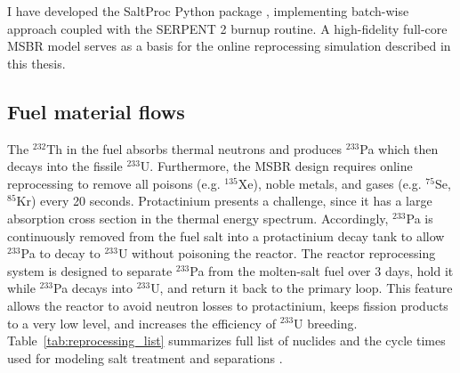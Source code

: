I have developed the SaltProc Python package \cite{andrei_rykhlevskii_arfc/saltproc:_2018}, implementing batch-wise approach coupled with the SERPENT 2 burnup routine. A high-fidelity full-core \gls{MSBR} model serves as a basis for the online reprocessing simulation described in this thesis. 

\subsection{Fuel material flows}
The $^{232}$Th in the fuel absorbs thermal neutrons and produces $^{233}$Pa which then decays into the fissile $^{233}$U. Furthermore, the \gls{MSBR} design requires online reprocessing to remove all poisons (e.g. $^{135}$Xe), noble metals, and gases (e.g. $^{75}$Se, $^{85}$Kr) every 20 seconds. Protactinium presents a challenge, since it has a large absorption cross section in the thermal energy spectrum. Accordingly, $^{233}$Pa is continuously removed from the fuel salt into a protactinium decay tank to allow $^{233}$Pa to decay to $^{233}$U without poisoning the reactor. The reactor reprocessing system is designed to separate $^{233}$Pa from the molten-salt fuel over 3 days, hold it while $^{233}$Pa decays into $^{233}$U, and return it back to the primary loop. This feature allows the reactor to avoid neutron losses to protactinium, keeps fission products to a very low level, and increases the efficiency of $^{233}$U breeding. Table~\ref{tab:reprocessing_list} summarizes full list of nuclides and the cycle times used for modeling salt treatment and separations \cite{robertson_conceptual_1971}. 


